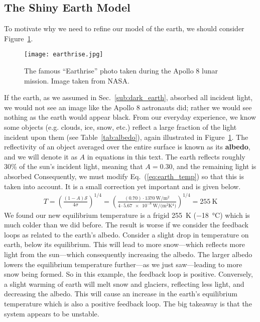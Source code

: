     \subsection{The Shiny Earth Model} %
    \label{sub:shiny_earth}
   
    To motivate why we need to refine our model of the earth, we should consider Figure~\ref{fig:earthrise}.

    \begin{figure}[hb!]
        \centering
        \texttt{[image: earthrise.jpg]}
        \caption{The famous ``Earthrise'' photo taken during the Apollo 8 lunar mission. Image taken from NASA.}
        \label{fig:earthrise}
    \end{figure}

    If the earth, as we assumed in Sec.~\ref{sub:dark_earth}, absorbed all incident light, we would not see an image like the Apollo 8 astronauts did; rather we would see nothing as the earth would appear black.  From our everyday experience, we know some objects (e.g. clouds, ice, snow, etc.) reflect a large fraction of the light incident upon them (see Table~\ref{tab:albedo}), again illustrated in Figure~\ref{fig:earthrise}. The reflectivity of an object averaged over the entire surface is known as its \textbf{albedo}, and we will denote it as $A$ in equations in this text. The earth reflects roughly 30\% of the sun's incident light, meaning that $A = 0.30$, and the remaining light is absorbed \citep{schroeder1999introduction,thorndike1976energy} Consequently, we must modify Eq.~(\ref{eq:earth_temp}) so that this is taken into account. It is a small correction yet important and is given below.
    \begin{align}
        T = \left( \frac{(1-A) \mathcal{S}}{4 \sigma} \right)^{1/4} = \left( \frac{(0.70) \cdot \SI{1370}{\watt/\meter^2}}{4 \cdot \SI{5.67e-8}{\watt/(\meter^2 \kelvin^4)} } \right)^{1/4} = \SI{255}{\kelvin}
        \label{eq:shiny_earth_temp}
    \end{align}
    We found our new equilibrium temperature is a frigid \SI{255}{\kelvin} (\SI{-18}{\celsius}) which is much colder than we did before. The result is worse if we consider the feedback loops as related to the earth's albedo. Consider a slight drop in temperature on earth, below its equilibrium. This will lead to more snow---which reflects more light from the sun---which consequently increasing the albedo. The larger albedo lowers the equilibrium temperature further---as we just saw---leading to more snow being formed. So in this example, the feedback loop is positive. Conversely, a slight warming of earth  will melt snow and glaciers, reflecting less light, and decreasing the albedo. This will cause an increase in the earth's equilibrium temperature which is also a positive feedback loop. The big takeaway is that the system appears to be unstable.

